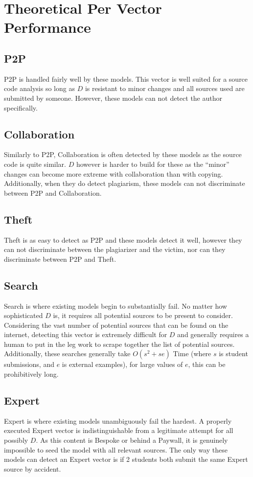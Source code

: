\documentclass[12pt,final,thesis,actual]{uhthesis}
\begin{document}
\section{\textbf{Theoretical Per Vector Performance}}
	\subsection{\textbf{P2P}}
		P2P is handled fairly well by these models.  This vector is well suited for a source code analysis so long as $D$ is resistant to minor changes and all sources used are submitted by someone.  However, these models can not detect the author specifically.
	\subsection{\textbf{Collaboration}}
		Similarly to P2P, Collaboration is often detected by these models as the source code is quite similar.  $D$ however is harder to build for these as the ``minor'' changes can become more extreme with collaboration than with copying.  Additionally, when they do detect plagiarism, these models can not discriminate between P2P and Collaboration.
	\subsection{\textbf{Theft}}
		Theft is as easy to detect as P2P and these models detect it well, however they can not discriminate between the plagiarizer and the victim, nor can they discriminate between P2P and Theft.
	\subsection{\textbf{Search}}
		Search is where existing models begin to substantially fail.  No matter how sophisticated $D$ is, it requires all potential sources to be present to consider.  Considering the vast number of potential sources that can be found on the internet, detecting this vector is extremely difficult for $D$ and generally requires a human to put in the leg work to scrape together the list of potential sources.  Additionally, these searches generally take $O(s^2+se)$ Time (where $s$ is student submissions, and $e$ is external examples), for large values of $e$, this can be prohibitively long.
	\subsection{\textbf{Expert} }
	Expert is where existing models unambiguously fail the hardest.  A properly executed Expert vector is indistinguishable from a legitimate attempt for all possibly $D$.  As this content is Bespoke or behind a Paywall, it is genuinely impossible to seed the model with all relevant sources.  The only way these models can detect an Expert vector is if 2 students both submit the same Expert source by accident.
\end{document}
